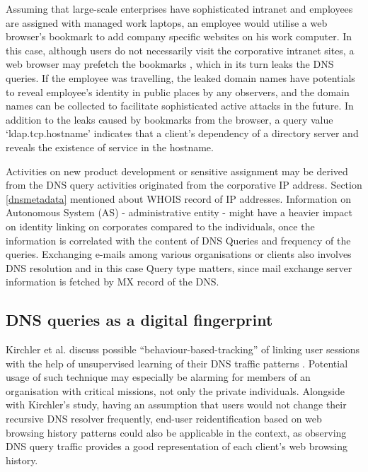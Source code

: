 Assuming that large-scale enterprises have sophisticated intranet and employees are assigned with managed work laptops, an employee would utilise a web browser's bookmark to add company specific websites on his work computer.
In this case, although users do not necessarily visit the corporative intranet sites, a web browser may prefetch the bookmarks \cite{firefox-autocomplete-url, chrome-dns-prefectching}, which in its turn leaks the DNS queries.
If the employee was travelling, the leaked domain names have potentials to reveal employee's identity in public places by any observers, and the domain names can be collected to facilitate sophisticated active attacks in the future.
In addition to the leaks caused by bookmarks from the browser, a query value `\textunderscore ldap.\textunderscore tcp.hostname' indicates that a client's dependency of a directory server \cite{Shulman:2014} and reveals the existence of service in the hostname.

Activities on new product development or sensitive assignment may be derived from the DNS query activities originated from the corporative IP address. Section \ref{dnsmetadata} mentioned about WHOIS record of IP addresses. Information on Autonomous System (AS) - administrative entity - might have a heavier impact on identity linking on corporates compared to the individuals, once the information is correlated with the content of DNS Queries and frequency of the queries. Exchanging e-mails among various organisations or clients also involves DNS resolution and in this case Query type matters, since mail exchange server information is fetched by MX record of the DNS.

\subsection{DNS queries as a digital fingerprint}\label{fingerprint}
Kirchler et al. discuss possible ``behaviour-based-tracking'' of linking user sessions with the help of unsupervised learning of their DNS traffic patterns \cite{kirchler2016tracked}. Potential usage of such technique may especially be alarming for members of an organisation with critical missions, not only the private individuals.
Alongside with Kirchler's study, having an assumption that users would not change their recursive DNS resolver frequently, end-user reidentification based on web browsing history patterns \cite{olejnik2012johnny} could also be applicable in the context, as observing DNS query traffic provides a good representation of each client's web browsing history.
